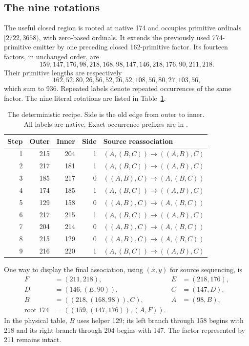 \subsection{The nine rotations}

The useful closed region is rooted at native 174 and occupies primitive
ordinals $[2722,3658)$, with zero-based ordinals. It extends the previously
used 774-primitive emitter by one preceding closed 162-primitive factor.
Its fourteen factors, in unchanged order, are
\[
 159,147,176,98,218,168,98,147,146,218,176,90,211,218.
\]
Their primitive lengths are respectively
\[
 162,52,80,26,56,52,26,52,108,56,80,27,103,56,
\]
which sum to 936. Repeated labels denote repeated occurrences of the same
factor. The nine literal rotations are listed in Table~\ref{tab:rotations}.

\begin{table}[htbp]
\centering
\begin{tabular}{rrrrl}
\toprule
Step & Outer & Inner & Side & Source reassociation\\
\midrule
1&215&204&1&$(A,(B,C))\to((A,B),C)$\\
2&217&181&1&$(A,(B,C))\to((A,B),C)$\\
3&185&217&0&$((A,B),C)\to(A,(B,C))$\\
4&174&185&1&$(A,(B,C))\to((A,B),C)$\\
5&129&158&0&$((A,B),C)\to(A,(B,C))$\\
6&217&215&1&$(A,(B,C))\to((A,B),C)$\\
7&204&214&0&$((A,B),C)\to(A,(B,C))$\\
8&215&129&0&$((A,B),C)\to(A,(B,C))$\\
9&216&220&1&$(A,(B,C))\to((A,B),C)$\\
\bottomrule
\end{tabular}
\caption{The deterministic recipe. Side is the old edge from outer to inner.
All labels are native. Exact occurrence prefixes are in
\protect{}.}
\label{tab:rotations}
\end{table}

One way to display the final association, using $(x,y)$ for source
sequencing, is
\begin{align*}
 F&=(211,218), & E&=(218,176),\\
 D&=(146,(E,90)), & C&=(147,D),\\
 B&=((218,(168,98)),C), & A&=(98,B),\\
 \text{root }174&=((159,(147,176)),(A,F)).
\end{align*}
In the physical table, $B$ uses helper 129; its left branch through 158
begins with 218 and its right branch through 204 begins with 147. The
factor represented by 211 remains intact.

